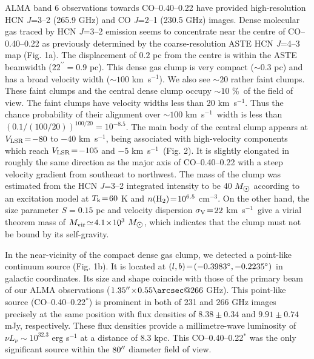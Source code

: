 \documentclass{nature}
\def\kms{\hbox{km s$^{-1}$}}
\def\VLSR{\hbox{$V_{\rm LSR}$}}
\def\sun{\hbox{$\odot$}}
\def\arcdeg{\hbox{$^\circ$}}
\def\arcsec{\hbox{$^{\prime\prime}$}}
\begin{document}
ALMA band 6 observations towards CO--0.40--0.22 have provided high-resolution HCN {\it J}=3--2 (265.9 GHz) and CO {\it J}=2--1 (230.5 GHz) images. Dense molecular gas traced by HCN {\it J}=3--2 emission seems to concentrate near the centre of CO--0.40--0.22 as previously determined by the coarse-resolution ASTE HCN {\it J}=4--3 map (Fig. 1a). The displacement of $0.2$ pc from the centre is within the ASTE beamwidth ($22^{\prime\prime}\!=\!0.9$ pc). This dense gas clump is very compact ($\sim\! 0.3$ pc) and has a broad velocity width ($\sim\! 100$ \kms). 
We also see $\sim\! 20$ rather faint clumps. These faint clumps and the central dense clump occupy $\sim\!10$ \%\ of the field of view. The faint clumps have velocity widths less than 20 \kms. Thus the chance probability of their alignment over $\sim\! 100$ \kms\ width is less than $(0.1/(100/20))^{100/20}\!=\! 10^{-8.5}$.  
The main body of the central clump appears at $\VLSR\!=\!-80$ to $-40$ \kms, being associated with high-velocity components which reach $\VLSR\!=\!-105$ and $-5$ \kms\ (Fig. 2). It is slightly elongated in roughly the same direction as the major axis of CO--0.40--0.22 with a steep velocity gradient from southeast to northwest. The mass of the clump was estimated from the HCN {\it J}=3--2 integrated intensity to be $40$ $M_{\sun}$ according to an excitation model at $T_{\rm k}\!=\!60$ K and $n({\rm H}_2)\!=\!10^{6.5}$ cm$^{-3}$. On the other hand, the size parameter $S\!=\!0.15$ pc and velocity dispersion $\sigma_{\rm V}\!=\!22$ \kms\ give a virial theorem mass of $M_{\rm vir}\!\simeq\!4.1\!\times\! 10^3$ $M_{\sun}$, which indicates that the clump must not be bound by its self-gravity. 

In the near-vicinity of the compact dense gas clump, we detected a point-like continuum source (Fig. 1b). It is located at $(l, b)\!=\!(-0.3983\arcdeg, -0.2235\arcdeg)$ in galactic coordinates. Its size and shape coincide with those of the primary beam of our ALMA observations ($1.35\arcsec\!\times\!0.55\arcsec@266$ GHz). This point-like source (CO--0.40--0.22$^*$) is prominent in both of 231 and 266 GHz images precisely at the same position with flux densities of $8.38\!\pm\!0.34$ and $9.91\!\pm\!0.74$ mJy, respectively. These flux densities provide a millimetre-wave luminosity of $\nu L_{\nu}\!\sim\! 10^{32.3}$ erg s$^{-1}$ at a distance of 8.3 kpc\cite{Gillessen09}. This CO--0.40--0.22$^*$ was the only significant source within the $80\arcsec$ diameter field of view.
\end{document}
